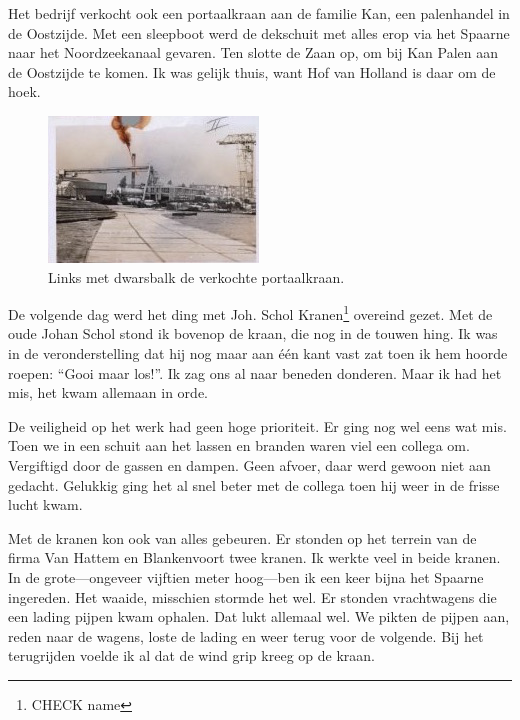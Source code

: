 \documentclass[10pt,twoside, openright]{memoir}
\begin{document}
Het bedrijf verkocht ook een portaalkraan aan de familie Kan, een palenhandel in de Oostzijde. Met een sleepboot werd de dekschuit met alles erop via het Spaarne naar het Noordzeekanaal gevaren. Ten slotte de Zaan op, om bij Kan Palen aan de Oostzijde te komen. Ik was gelijk thuis, want Hof van Holland is daar om de hoek. 

\begin{figure}
\includegraphics[width=\textwidth]{img/ch38/portaalkraan}
\caption*{\footnotesize Links met dwarsbalk de verkochte portaalkraan.}
\end{figure}

De volgende dag werd het ding met Joh. Schol Kranen\footnote{CHECK name} overeind gezet. Met de oude Johan Schol stond ik bovenop de kraan, die nog in de touwen hing. Ik was in de veronderstelling dat hij nog maar aan één kant vast zat toen ik hem hoorde roepen: ``Gooi maar los!''. Ik zag ons al naar beneden donderen. Maar ik had het mis, het kwam allemaan in orde. 

De veiligheid op het werk had geen hoge prioriteit. Er ging nog wel eens wat mis. Toen we in een schuit aan het lassen en branden waren viel een collega om. Vergiftigd door de gassen en dampen. Geen afvoer, daar werd gewoon niet aan gedacht. Gelukkig ging het al snel beter met de collega toen hij weer in de frisse lucht kwam.

Met de kranen kon ook van alles gebeuren. Er stonden op het terrein van de firma Van Hattem en Blankenvoort twee kranen. Ik werkte veel in beide kranen. In de grote---ongeveer vijftien meter hoog---ben ik een keer bijna het Spaarne ingereden. Het waaide, misschien stormde het wel. Er stonden vrachtwagens die een lading pijpen kwam ophalen. Dat lukt allemaal wel. We pikten de pijpen aan, reden naar de wagens, loste de lading en weer terug voor de volgende. Bij het terugrijden voelde ik al dat de wind grip kreeg op de kraan. 
\end{document}
